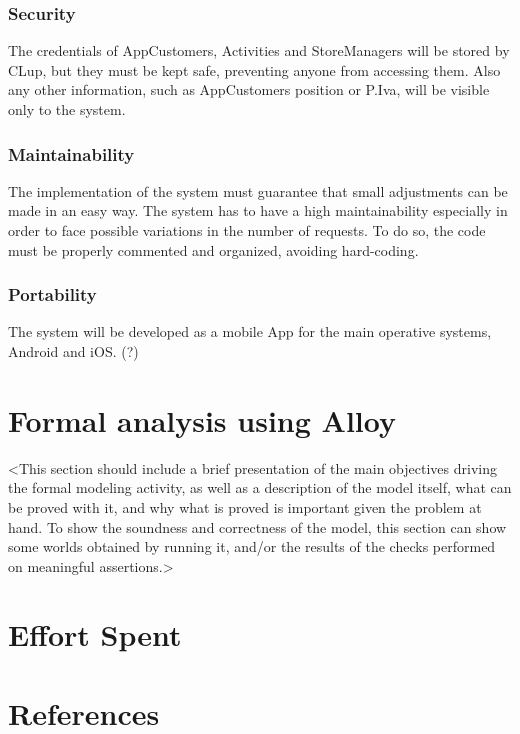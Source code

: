\documentclass{article}
\begin{document}
         \subsubsection{Security}
         The credentials of AppCustomers, Activities and StoreManagers will be stored by CLup, but they must be kept safe, preventing anyone from accessing them. Also any other information, such as AppCustomers position or P.Iva, will be visible only to the system.
         \subsubsection{Maintainability}
         The implementation of the system must guarantee that small adjustments can be made in an easy way. The system has to have a high maintainability especially in order to face possible variations in the number of requests. To do so, the code must be properly commented and organized, avoiding hard-coding.
         \subsubsection{Portability}
         The system will be developed as a mobile App for the main operative systems,  Android and iOS. (?)
	\section{Formal analysis using Alloy}
	<This section should include a brief presentation of the main objectives driving the formal modeling activity, as well as a description of the model itself, what can be proved with it, and why what is proved is important given the problem at hand. To show the soundness and correctness of the model, this section can show some worlds obtained by running it, and/or the results of the checks performed on meaningful assertions.>
	\section{Effort Spent}
	\section{References}
  
\end{document}
